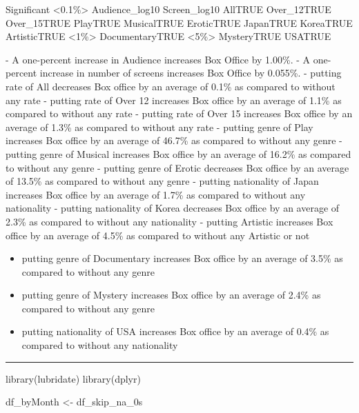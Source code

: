 \documentclass[
]{article}
\newenvironment{Shaded}{\begin{snugshade}}{\end{snugshade}}
\newcommand{\FunctionTok}[1]{\textcolor[rgb]{0.00,0.00,0.00}{#1}}
\newcommand{\NormalTok}[1]{#1}
\newcommand{\OtherTok}[1]{\textcolor[rgb]{0.56,0.35,0.01}{#1}}
\begin{document}
Significant \textless0.1\%\textgreater{} Audience\_log10 Screen\_log10
AllTRUE Over\_12TRUE Over\_15TRUE PlayTRUE MusicalTRUE EroticTRUE
JapanTRUE KoreaTRUE ArtisticTRUE \textless1\%\textgreater{}
DocumentaryTRUE \textless5\%\textgreater{} MysteryTRUE USATRUE

- A one-percent increase in Audience increases Box Office by 1.00\%. - A
one-percent increase in number of screens increases Box Office by
0.055\%. - putting rate of All decreases Box office by an average of
0.1\% as compared to without any rate - putting rate of Over 12
increases Box office by an average of 1.1\% as compared to without any
rate - putting rate of Over 15 increases Box office by an average of
1.3\% as compared to without any rate - putting genre of Play increases
Box office by an average of 46.7\% as compared to without any genre -
putting genre of Musical increases Box office by an average of 16.2\% as
compared to without any genre - putting genre of Erotic decreases Box
office by an average of 13.5\% as compared to without any genre -
putting nationality of Japan increases Box office by an average of 1.7\%
as compared to without any nationality - putting nationality of Korea
decreases Box office by an average of 2.3\% as compared to without any
nationality - putting Artistic increases Box office by an average of
4.5\% as compared to without any Artistic or not

\begin{itemize}
\item
  putting genre of Documentary increases Box office by an average of
  3.5\% as compared to without any genre
\item
  putting genre of Mystery increases Box office by an average of 2.4\%
  as compared to without any genre
\item
  putting nationality of USA increases Box office by an average of 0.4\%
  as compared to without any nationality
\end{itemize}

\begin{center}\rule{0.5\linewidth}{0.5pt}\end{center}

\begin{Shaded}
\begin{Highlighting}[]
\FunctionTok{library}\NormalTok{(lubridate)}
\FunctionTok{library}\NormalTok{(dplyr)}
\end{Highlighting}
\end{Shaded}

\begin{Shaded}
\begin{Highlighting}[]
\NormalTok{df\_byMonth }\OtherTok{\textless{}{-}}\NormalTok{ df\_skip\_na\_0s}
\end{Highlighting}
\end{Shaded}
\end{document}
